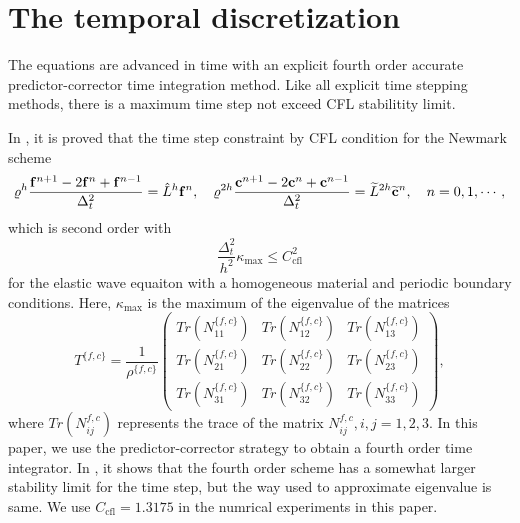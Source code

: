 \section{The temporal discretization}
The equations are advanced in time with an explicit fourth order accurate predictor-corrector time integration method. Like all explicit time stepping methods, there is a maximum time step not exceed CFL stabilitity limit.

In \cite{petersson2015wave}, it is proved that the time step constraint by CFL condition for the Newmark scheme 
\begin{equation*}
\varrho^h\frac{{\bf f}^{n+1}-2{\bf f}^n + {\bf f}^{n-1}}{\Delta_t^2} = \hat{L}^h {\bf f}^n, \ \ \ 
\varrho^{2h}\frac{{\bf c}^{n+1}-2{\bf c}^n + {\bf c}^{n-1}}{\Delta_t^2} = \wt{L}^{2h} \wt{\bf c}^n, \ \ \ n = 0,1,\cdots,
\end{equation*}
which is second order with
\begin{equation*}
\frac{\Delta_t^2}{h^2}\kappa_{\text{max}}\leq C_{\text{cfl}}^2
\end{equation*}
for the elastic wave equaiton with a homogeneous material and periodic boundary conditions. Here, 
$\kappa_{\text{max}}$ is the maximum of the eigenvalue of the matrices 
\[T^{\{f,c\}} = \frac{1}{\rho^{\{f,c\}}}\left(\begin{array}{ccc}
Tr(N_{11}^{\{f,c\}}) &  Tr(N_{12}^{\{f,c\}})& Tr(N_{13}^{\{f,c\}})\\
Tr(N_{21}^{\{f,c\}}) & Tr(N_{22}^{\{f,c\}}) & Tr(N_{23}^{\{f,c\}})\\
Tr(N_{31}^{\{f,c\}}) & Tr(N_{32}^{\{f,c\}}) & Tr(N_{33}^{\{f,c\}})\end{array}\right), \]
where $Tr(N_{ij}^{f,c})$ represents the trace of the matrix $N_{ij}^{f,c},i,j = 1,2,3$. In this paper, we use the predictor-corrector strategy to obtain a fourth order time integrator. In \cite{sjogreen2012fourth}, it shows that the fourth order scheme has a somewhat larger stability limit for the time step, but the way used to approximate eigenvalue is same. We use $C_{\text{cfl}} = 1.3175$ in the numrical experiments in this paper.